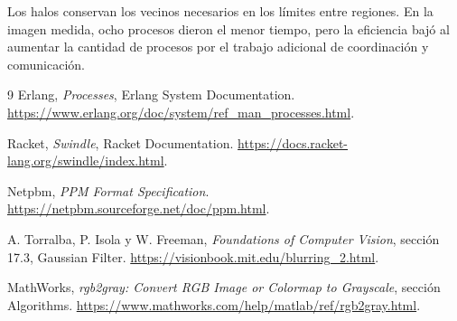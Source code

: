 \documentclass[11pt]{article}
\begin{document}
Los halos conservan los vecinos necesarios en los límites entre regiones.
En la imagen medida, ocho procesos dieron el menor tiempo, pero la eficiencia
bajó al aumentar la cantidad de procesos por el trabajo adicional de
coordinación y comunicación.

\clearpage

\begin{thebibliography}{9}
    Erlang, \emph{Processes}, Erlang System Documentation.
    \url{https://www.erlang.org/doc/system/ref_man_processes.html}.

    Racket, \emph{Swindle}, Racket Documentation.
    \url{https://docs.racket-lang.org/swindle/index.html}.

    Netpbm, \emph{PPM Format Specification}.
    \url{https://netpbm.sourceforge.net/doc/ppm.html}.

    A. Torralba, P. Isola y W. Freeman,
    \emph{Foundations of Computer Vision}, sección 17.3, Gaussian Filter.
    \url{https://visionbook.mit.edu/blurring_2.html}.

    MathWorks, \emph{rgb2gray: Convert RGB Image or Colormap to Grayscale},
    sección Algorithms.
    \url{https://www.mathworks.com/help/matlab/ref/rgb2gray.html}.
\end{thebibliography}
\end{document}
